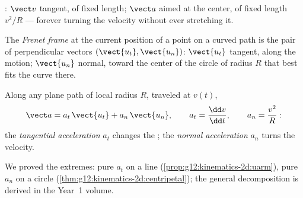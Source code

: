 \begin{omfigure}

{\small {}: $\vect v$ tangent, of fixed length;
$\vect a$ aimed at the center, of fixed length $v^2/R$ --- forever
turning the velocity without ever stretching it.}
\end{omfigure}

\begin{definition}\label{def:g12:kinematics-2d:frenet}
The \emph{Frenet frame} at the current position
of a point on a curved path is the pair of perpendicular 
vectors $(\vect{u_t}, \vect{u_n})$: $\vect{u_t}$ tangent, along the
motion; $\vect{u_n}$ normal, toward the center of the circle of
radius $R$ that best fits the curve there.
\end{definition}

\begin{proposition}\label{prop:g12:kinematics-2d:frenetacc}
Along any plane path of local radius $R$, traveled at  $v(t)$,
\[
\vect a = a_t\,\vect{u_t} + a_n\,\vect{u_n},
\qquad a_t = \frac{\dd v}{\dd t},
\qquad a_n = \frac{v^2}{R}:
\]
the \emph{tangential acceleration}
$a_t$ changes the ; the \emph{normal
acceleration} $a_n$ turns the velocity.
\end{proposition}
\admitted

\begin{remark}\label{rem:g12:kinematics-2d:frenetproof}
We proved the extremes: pure $a_t$ on a line
(\cref{prop:g12:kinematics-2d:uarm}), pure $a_n$ on a circle
(\cref{thm:g12:kinematics-2d:centripetal}); the general
decomposition is derived in the Year~1 volume.
\end{remark}

